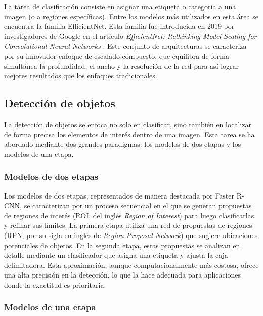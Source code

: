 La tarea de clasificación consiste en asignar una etiqueta o categoría a una imagen (o a regiones específicas). Entre los modelos más utilizados en esta área se encuentra la familia EfficientNet. Esta familia fue introducida en 2019 por investigadores de Google en el artículo \textit{EfficientNet: Rethinking Model Scaling for Convolutional Neural Networks} \citep{tan_efficientnet_2020}. Este conjunto de arquitecturas se caracteriza por su innovador enfoque de escalado compuesto, que equilibra de forma simultánea la profundidad, el ancho y la resolución de la red para así lograr mejores resultados que los enfoques tradicionales.

\subsection{Detección de objetos}

La detección de objetos se enfoca no solo en clasificar, sino también en localizar de forma precisa los elementos de interés dentro de una imagen. Esta tarea se ha abordado mediante dos grandes paradigmas: los modelos de dos etapas y los modelos de una etapa.

\subsubsection{Modelos de dos etapas}

Los modelos de dos etapas, representados de manera destacada por Faster R-CNN, se caracterizan por un proceso secuencial en el que se generan propuestas de regiones de interés (ROI, del inglés \textit{Region of Interest}) para luego clasificarlas y refinar sus límites. La primera etapa utiliza una red de propuestas de regiones (RPN, por su sigla en inglés de \textit{Region Proposal Network}) que sugiere ubicaciones potenciales de objetos. En la segunda etapa, estas propuestas se analizan en detalle mediante un clasificador que asigna una etiqueta y ajusta la caja delimitadora. Esta aproximación, aunque computacionalmente más costosa, ofrece una alta precisión en la detección, lo que la hace adecuada para aplicaciones donde la exactitud es prioritaria.

\subsubsection{Modelos de una etapa}

